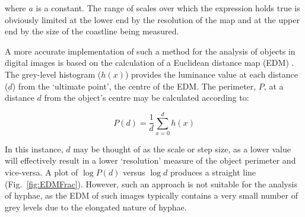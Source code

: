\noindent where $a$ is a constant. The range of scales over which the expression holds true is obviously limited at the lower end by the resolution of the map and at the upper end by the size of the coastline being measured.

A more accurate implementation of such a method for the analysis of objects in digital images is based on the calculation of a Euclidean distance map (EDM) \cite{russ2002}. The grey-level histogram ($h(x)$) provides the luminance value at each distance ($d$) from the \lq ultimate point', the centre of the EDM. The perimeter, $P$, at a distance $d$ from the object's centre may be calculated according to:

\begin{equation}\label{eq:P(d)}
	P(d) = \frac{1}{d}{\displaystyle \sum_{x=0}^d h(x)}
\end{equation}

\noindent In this instance, $d$ may be thought of as the scale or step size, as a lower value will effectively result in a lower \lq resolution' measure of the object perimeter and vice-versa.  A plot of $ \log P(d)$ versus $ \log d$ produces a straight line (Fig.~\ref{fig:EDMFrac}). However, such an approach is not suitable for the analysis of hyphae, as the EDM of such images typically contains a very small number of grey levels due to the elongated nature of hyphae.

